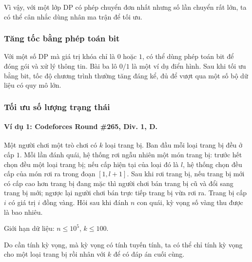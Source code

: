 \documentclass[11pt]{article}
\begin{document}
Vì vậy, với một lớp DP có phép chuyển đơn nhất nhưng số lần chuyển rất lớn, ta có
thể cân nhắc dùng nhân ma trận để tối ưu.

\subsubsection{Tăng tốc bằng phép toán bit}

Với một số DP mà giá trị khóa chỉ là \(0\) hoặc \(1\), có thể dùng phép toán bit
để đóng gói và xử lý thông tin. Bài ba lô \(0/1\) là một ví dụ điển hình. Sau
khi tối ưu bằng bit, tốc độ chương trình thường tăng đáng kể, đủ để vượt qua một
số bộ dữ liệu có quy mô lớn.

\subsubsection{Tối ưu số lượng trạng thái}

\paragraph{Ví dụ 1: Codeforces Round \#265, Div. 1, D.}
Một người chơi một trò chơi có \(k\) loại trang bị. Ban đầu mỗi loại trang bị
đều ở cấp \(1\). Mỗi lần đánh quái, hệ thống rơi ngẫu nhiên một món trang bị:
trước hết chọn đều một loại trang bị; nếu cấp hiện tại của loại đó là \(l\), hệ
thống chọn đều cấp của món rơi ra trong đoạn \([1,l+1]\). Sau khi rơi trang bị,
nếu trang bị mới có cấp cao hơn trang bị đang mặc thì người chơi bán trang bị
cũ và đổi sang trang bị mới; ngược lại người chơi bán trực tiếp trang bị vừa
rơi ra. Trang bị cấp \(i\) có giá trị \(i\) đồng vàng. Hỏi sau khi đánh \(n\)
con quái, kỳ vọng số vàng thu được là bao nhiêu.

Giới hạn dữ liệu: \(n\le 10^5\), \(k\le 100\).

Do cần tính kỳ vọng, mà kỳ vọng có tính tuyến tính, ta có thể chỉ tính kỳ vọng
cho một loại trang bị rồi nhân với \(k\) để có đáp án cuối cùng.
\end{document}
